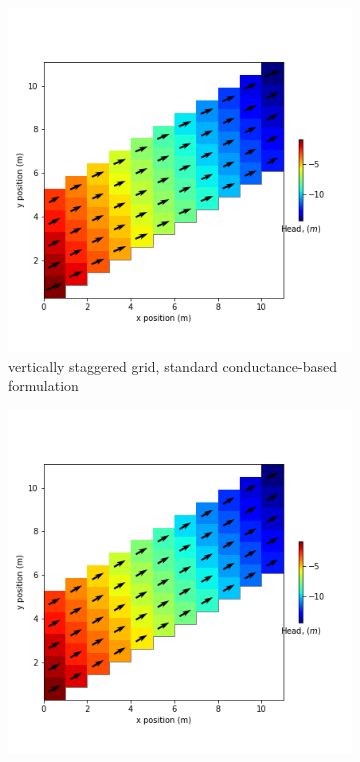 \documentclass{article}
\begin{document}
\begin{figure}[H]
\centering
\begin{subfigure}{0.4\textwidth}
	\includegraphics[width=\textwidth]{../figures/disu-af-vs-s-head.png}
	\caption{vertically staggered grid, standard conductance-based formulation}
	\label{fig:disu-s-cc-head}
\end{subfigure}
\hfill
\begin{subfigure}{0.4\textwidth}
	\includegraphics[width=\textwidth]{../figures/disu-af-vs-x-head.png}

\end{subfigure}
\end{figure}
\end{document}
